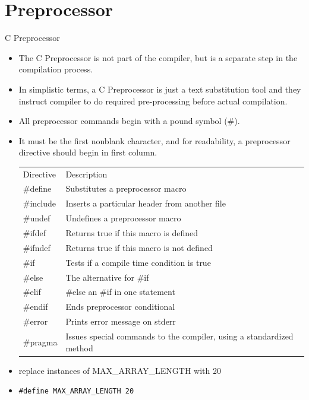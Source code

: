 \documentclass[10pt,t]{beamer}
\begin{document}
\section{Preprocessor}
\begin{frame}{C Preprocessor}
  \begin{itemize}
  \item The C Preprocessor is not part of the compiler, but is a separate step in the compilation process.
  \item In simplistic terms, a C Preprocessor is just a text substitution tool and they instruct compiler to do required pre-processing before actual compilation.
  \item All preprocessor commands begin with a pound symbol (\#).
  \item It must be the first nonblank character, and for readability, a preprocessor directive should begin in first column.    
    \begin{center}
      {\scriptsize
        \begin{tabular}{af}
          Directive & Description \\
          \#define & Substitutes a preprocessor macro \\
          \#include & Inserts a particular header from another file \\
          \#undef & Undefines a preprocessor macro \\
          \#ifdef & Returns true if this macro is defined \\
          \#ifndef & Returns true if this macro is not defined \\
          \#if & Tests if a compile time condition is true \\
          \#else & The alternative for \#if \\
          \#elif & \#else an \#if in one statement \\
          \#endif & Ends preprocessor conditional \\
          \#error & Prints error message on stderr \\
          \#pragma & Issues special commands to the compiler, using a standardized method \\
        \end{tabular}
      }
    \end{center}
    \framebreak
  \item replace instances of MAX\_ARRAY\_LENGTH with 20
  \item[] \lstinline[basicstyle=\scriptsize\ttfamily]|#define MAX_ARRAY_LENGTH 20|

\end{itemize}
\end{frame}
\end{document}

